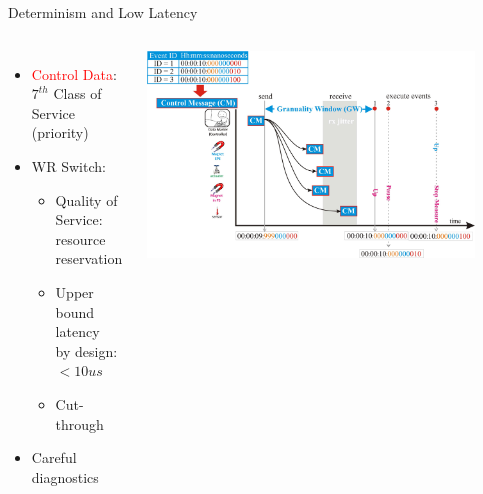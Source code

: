 \documentclass[compress,red]{beamer}
\begin{document}
\begin{frame}{Determinism and Low Latency}

\begin{columns}[c]

      \begin{itemize}
	    \item \textcolor{red}{Control Data}: \\$7^{th}$ Class of Service (priority)
	    \item WR Switch:
	    \begin{itemize}
	      \item Quality of Service: resource reservation
	      \item Upper bound latency \\ by design: $<10us$
	      \item Cut-through
	    \end{itemize}
	    \item Careful diagnostics
      \end{itemize}
% 
    \begin{center}
    \includegraphics[width=0.9\textwidth]{applications/CERN/event3.pdf}
    \end{center}

\end{columns}

\end{frame}
\end{document}
